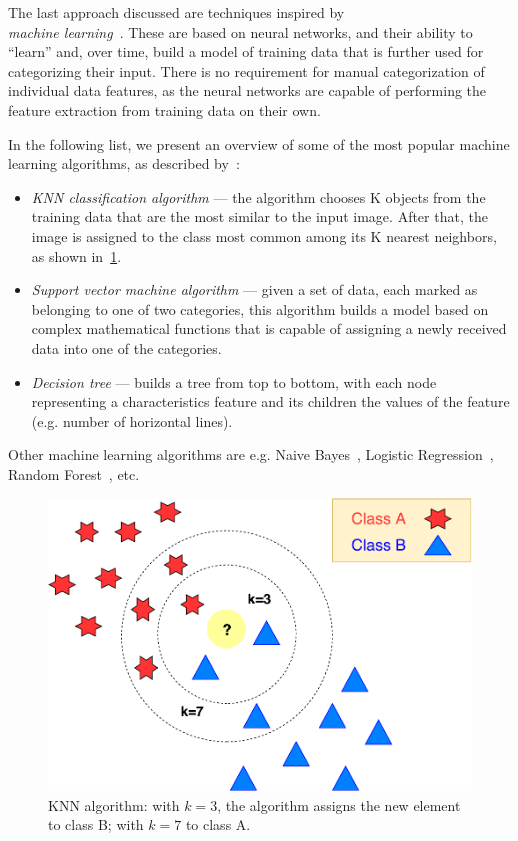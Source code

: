 The last approach discussed are techniques inspired by \\\emph{machine learning}~\citep{sebastiani2002machine}. These are based on neural networks, and their ability to ``learn'' and, over time, build a model of training data that is further used for categorizing their input. There is no requirement for manual categorization of individual data features, as the neural networks are capable of performing the feature extraction from training data on their own.

In the following list, we present an overview of some of the most popular machine learning algorithms, as described by~\citet{bhavsar2012comparative}:
\begin{itemize}
    \item \emph{KNN classification algorithm} --- the algorithm chooses K objects from the training data that are the most similar to the input image. After that, the image is assigned to the class most common among its K nearest neighbors, as shown in~\cref{fig:characterClassKNN}.
    \item \emph{Support vector machine algorithm} --- given a set of data, each marked as belonging to one of two categories, this algorithm builds a model based on complex mathematical functions that is capable of assigning a newly received data into one of the categories.
    \item \emph{Decision tree} --- builds a tree from top to bottom, with each node representing a characteristics feature and its children the values of the feature (e.g. number of horizontal lines).
\end{itemize}
Other machine learning algorithms are e.g. Naive Bayes~\cite{ng2002discriminative}, Logistic Regression~\cite{ng2002discriminative}, Random Forest~\cite{segal2004machine}, etc.

\begin{figure}[t]
\centering
\includegraphics[width=0.7\linewidth]{img/characterClassification/knn.pdf}
\caption{KNN algorithm: with $k=3$, the algorithm assigns the new element to class B; with $k=7$ to class A.} \label{fig:characterClassKNN}
\end{figure}

